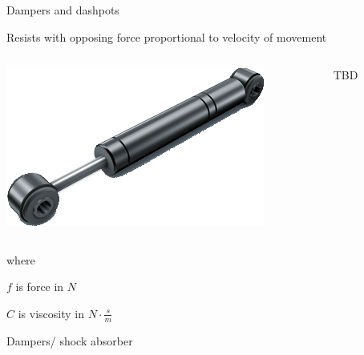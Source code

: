 \documentclass[compress]{beamer}
\begin{document}
\begin{frame}{Dampers and dashpots}

Resists with opposing force proportional to velocity of movement


    \begin{columns}
        \begin{column}{0.5\linewidth}
            \begin{center}
                \includegraphics[height=0.3\paperheight]{image57}
            \end{center}
        \end{column}
        \begin{column}{0.5\linewidth}
            TBD
        \end{column}
    \end{columns}

where

$f$ is force in $N$

    $C$ is viscosity in $N\cdot \frac{s}{m}$

Dampers/ shock absorber

\end{frame}
\end{document}
